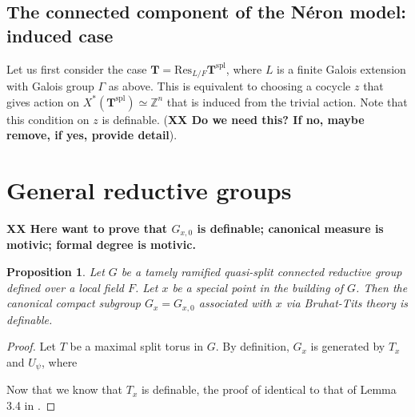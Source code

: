 \documentclass{amsart}
\newcommand{\Z}{{\mathbb Z}}
\newcommand{\bT}{\mathbf {T}}
\newcommand\spl{\mathrm{spl}}
\newcommand{\Res}{\mathrm{Res}}
\theoremstyle{plain}
\newtheorem{prop}[thm]{Proposition}
\theoremstyle{definition}
\begin{document}
\subsection{The connected component of the N\'eron model: induced case}
Let us first consider the case $\bT=\Res_{L/F} \bT^\spl$, where $L$ is a finite Galois extension with Galois group $\Gamma$ as above. This is equivalent to choosing a cocycle $z$ that gives action on $X^\ast(\bT^\spl)\simeq \Z^n$ that is induced from the trivial action. 
Note that this condition on $z$ is definable. ({\bf XX Do we need this? If no, maybe remove, if yes, provide detail}).


\section{General reductive groups}
{\bf XX Here want to prove that $G_{x, 0}$ is definable; canonical measure is motivic; formal degree is motivic. }
\begin{prop} Let $G$ be a tamely ramified quasi-split connected reductive group defined over a local field $F$. 
Let $x$ be a special point in the building of $G$. 
Then the canonical compact subgroup $G_x=G_{x, 0}$ associated with $x$ via Bruhat-Tits theory is definable. 
\end{prop}
\begin{proof} Let $T$ be a maximal split torus in $G$.
By definition, $G_x$ is generated by $T_x$ and $U_\psi$, where 
 
Now that we know that $T_x$ is definable, the proof of identical to that of Lemma 3.4 in \cite{CGH-2}.  
\end{proof} 
\end{document}

